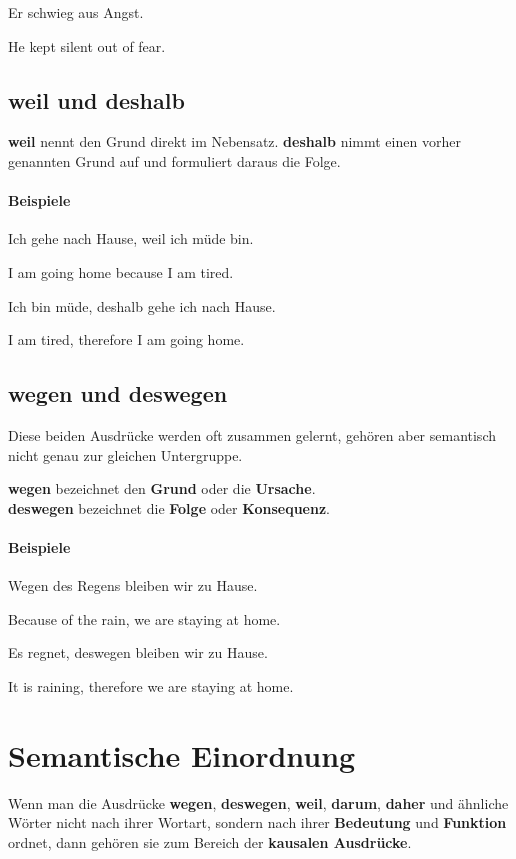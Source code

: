 \documentclass[a4paper]{article}
\newcommand{\EN}[1]{\par{\small\textcolor{TranslationGray}{#1}}\vspace{0.25em}}
\begin{document}
        Er schwieg aus Angst.\\
        \EN{He kept silent out of fear.}
    
    \subsection{weil und deshalb}
    \textbf{weil} nennt den Grund direkt im Nebensatz. \textbf{deshalb} nimmt einen vorher genannten Grund auf und formuliert daraus die Folge.
    
    \paragraph{Beispiele}
        Ich gehe nach Hause, weil ich müde bin.\\
        \EN{I am going home because I am tired.}
        
        Ich bin müde, deshalb gehe ich nach Hause.\\
        \EN{I am tired, therefore I am going home.}
    
    \subsection{wegen und deswegen}
    Diese beiden Ausdrücke werden oft zusammen gelernt, gehören aber semantisch nicht genau zur gleichen Untergruppe.
    
    \textbf{wegen} bezeichnet den \textbf{Grund} oder die \textbf{Ursache}.\\
    \textbf{deswegen} bezeichnet die \textbf{Folge} oder \textbf{Konsequenz}.
    
    \paragraph{Beispiele}
        Wegen des Regens bleiben wir zu Hause.\\
        \EN{Because of the rain, we are staying at home.}
        
        Es regnet, deswegen bleiben wir zu Hause.\\
        \EN{It is raining, therefore we are staying at home.}
    
    
    \section{Semantische Einordnung}
    Wenn man die Ausdrücke \textbf{wegen}, \textbf{deswegen}, \textbf{weil}, \textbf{darum}, \textbf{daher} und ähnliche Wörter nicht nach ihrer Wortart, sondern nach ihrer \textbf{Bedeutung} und \textbf{Funktion} ordnet, dann gehören sie zum Bereich der \textbf{kausalen Ausdrücke}.
    
\end{document}
